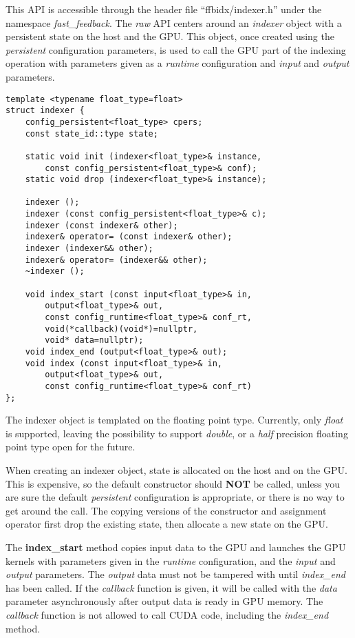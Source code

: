 \documentclass[a4paper,10pt]{article}
\begin{document}
This API is accessible through the header file ``ffbidx/indexer.h'' under the namespace \emph{fast\_feed\-back}. The \emph{raw} API centers around an \emph{indexer} object with a persistent state on the host and the GPU. This object, once created using the \emph{persistent} configuration parameters, is used to call the GPU part of the indexing operation with parameters given as a \emph{runtime} configuration and \emph{input} and \emph{output} parameters.
%
\begin{lstlisting}
template <typename float_type=float>
struct indexer {
    config_persistent<float_type> cpers;
    const state_id::type state;

    static void init (indexer<float_type>& instance,
        const config_persistent<float_type>& conf);
    static void drop (indexer<float_type>& instance);

    indexer ();
    indexer (const config_persistent<float_type>& c);
    indexer (const indexer& other);
    indexer& operator= (const indexer& other);
    indexer (indexer&& other);
    indexer& operator= (indexer&& other);
    ~indexer ();

    void index_start (const input<float_type>& in,
        output<float_type>& out,
        const config_runtime<float_type>& conf_rt,
        void(*callback)(void*)=nullptr,
        void* data=nullptr);
    void index_end (output<float_type>& out);
    void index (const input<float_type>& in,
        output<float_type>& out,
        const config_runtime<float_type>& conf_rt)
};
\end{lstlisting}
%
The indexer object is templated on the floating point type. Currently, only \emph{float} is supported, leaving the possibility to support \emph{double}, or a \emph{half} precision floating point type open for the future.

When creating an indexer object, state is allocated on the host and on the GPU. This is expensive, so the default constructor should \textbf{NOT} be called, unless you are sure the default \emph{persistent} configuration is appropriate, or there is no way to get around the call. The copying versions of the constructor and assignment operator first drop the existing state, then allocate a new state on the GPU.

The \textbf{index\_start} method copies input data to the GPU and launches the GPU kernels with parameters given in the \emph{runtime} configuration, and the \emph{input} and \emph{output} parameters. The \emph{output} data must not be tampered with until \emph{index\_end} has been called. If the \emph{callback} function is given, it will be called with the \emph{data} parameter asynchronously after output data is ready in GPU memory. The \emph{callback} function is not allowed to call CUDA code, including the \emph{index\_end} method.
\end{document}
